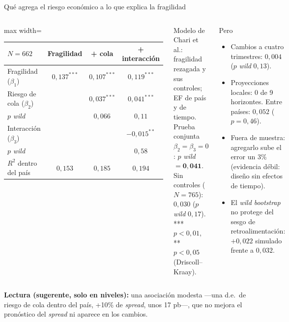 \documentclass[aspectratio=169]{beamer}
\begin{document}
\begin{frame}{Qué agrega el riesgo económico a lo que explica la fragilidad}
\begin{columns}[T]
\centering
\footnotesize
\begin{adjustbox}{max width=\textwidth}
\begin{tabular}{l ccc}
\toprule
$N=662$ & Fragilidad & + cola & + interacción \\
\midrule
Fragilidad ($\beta_1$) & $0{,}137^{***}$ & $0{,}107^{***}$ & $0{,}119^{***}$ \\
Riesgo de cola ($\beta_2$) & & $0{,}037^{***}$ & $0{,}041^{***}$ \\
\quad $p$ \textit{wild} & & $0{,}066$ & $0{,}11$ \\
Interacción ($\beta_3$) & & & $-0{,}015^{**}$ \\
\quad $p$ \textit{wild} & & & $0{,}58$ \\
$R^2$ dentro del país & $0{,}153$ & $0{,}185$ & $0{,}194$ \\
\bottomrule
\end{tabular}
\end{adjustbox}

\vspace{3pt}
{\scriptsize\raggedright Modelo de Chari et al.: fragilidad rezagada y sus controles; EF de país y de tiempo. Prueba conjunta $\beta_2=\beta_3=0$: $p$ \textit{wild} $=\mathbf{0{,}041}$. Sin controles ($N=765$): $0{,}030$ ($p$ \textit{wild} $0{,}17$). *** $p<0{,}01$, ** $p<0{,}05$ (Driscoll--Kraay).\par}
\begin{alertblock}{Pero}
\footnotesize
\begin{itemize}\setlength\itemsep{0pt}
\item Cambios a cuatro trimestres: $0{,}004$ ($p$ \textit{wild} $0{,}13$).
\item Proyecciones locales: 0 de 9 horizontes. Entre países: $0{,}052$ ($p=0{,}46$).
\item Fuera de muestra: agregarlo sube el error un 3\% (evidencia débil: diseño sin efectos de tiempo).
\item El \textit{wild bootstrap} no protege del sesgo de retroalimentación: $+0{,}022$ simulado frente a $0{,}032$.
\end{itemize}
\end{alertblock}
\end{columns}
\vspace{1pt}
{\footnotesize\raggedright \textbf{Lectura (sugerente, solo en niveles):} una asociación modesta ---una d.e.\ de riesgo de cola dentro del país, +10\% de \textit{spread}, unos 17 pb---, que no mejora el pronóstico del \textit{spread} ni aparece en los cambios.\par}
\end{frame}
\end{document}

